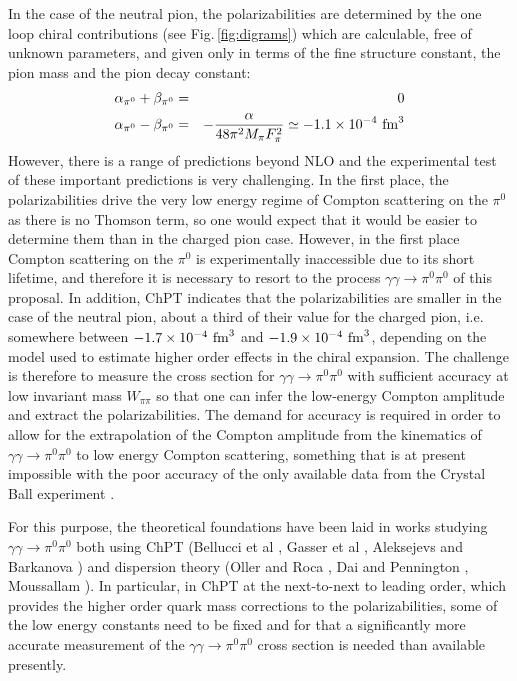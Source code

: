 In the case of the neutral pion, the polarizabilities are determined
by the one loop chiral contributions (see Fig.\,\ref{fig:digrams})
which are calculable, free of unknown parameters, and given only in
terms of the fine structure constant, the pion mass and the pion decay
constant:
\begin{eqnarray}
\alpha_{\pi^0}+\beta_{\pi^0}&=&0\nonumber\\
\alpha_{\pi^0}-\beta_{\pi^0}&=&-\frac{\alpha}{48 \pi^2 M_\pi F_\pi^2}\simeq -1.1\times 10^{-4}~{\rm fm}^3
\end{eqnarray}
However, there is a range of predictions beyond
NLO and the experimental test of these important predictions is very
challenging. In the first place, the polarizabilities drive the very
low energy regime of Compton scattering on the $\pi^0$ as there is no
Thomson term, so one would expect that it would be easier to determine
them than in the charged pion case.  However, in the first place
Compton scattering on the $\pi^0$ is experimentally inaccessible due
to its short lifetime, and therefore it is necessary to resort to the
process $\gamma\gamma\to \pi^0\pi^0$ of this proposal. In addition, ChPT indicates that the
polarizabilities are smaller in the case of the neutral pion, about a
third of their value for the charged pion, i.e. somewhere between
$-1.7\times 10^{-4}~{\rm fm}^3$ and $-1.9\times 10^{-4}~{\rm fm}^3$,
depending on the model used to estimate higher order effects in the chiral expansion. The challenge is therefore to measure the
cross section for $\gamma\gamma \to \pi^0\pi^0$ with sufficient
accuracy at low invariant mass $W_{\pi\pi}$ so that one can infer the
low-energy Compton amplitude and extract the polarizabilities. The demand for accuracy is required in order to allow for the extrapolation of the Compton amplitude from the kinematics of $\gamma\gamma \to \pi^0\pi^0$ to   low energy Compton scattering, something that is at present impossible with the poor accuracy of the only available data from the Crystal Ball experiment \cite{}.
 


For
this purpose, the theoretical foundations have been laid in works
studying $\gamma\gamma\to \pi^0\pi^0$ both using ChPT (Bellucci et al
\cite{Bellucci:1994hx,Bellucci:1994eb}, Gasser et al
\cite{Gasser:2005ud}, Aleksejevs and Barkanova
\cite{Aleksejevs:2014eea}) and dispersion theory (Oller and Roca
\cite{Oller:2008kf}, Dai and Pennington
\cite{Dai:2014zta,Dai:2014lza}, Moussallam
\cite{Moussallam:2013una}). In particular, in ChPT at the next-to-next
to leading order, which provides the higher order quark mass
corrections to the polarizabilities, some of the low energy constants
need to be fixed and for that a significantly more accurate
measurement of the $\gamma\gamma\to \pi^0\pi^0$ cross section is
needed than available presently.

